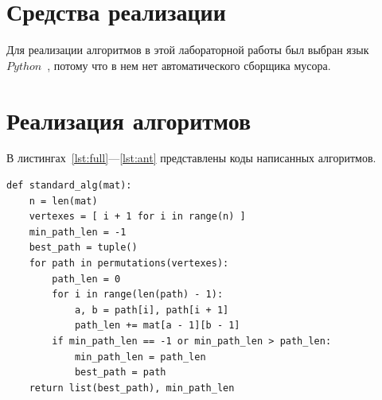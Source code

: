 \documentclass[a4paper, 12pt]{extreport}
\begin{document}
\section{Средства реализации}

Для реализации алгоритмов в этой лабораторной работы был выбран язык $Python$~\cite{python3}, потому что в нем нет 
автоматического сборщика мусора.

\section{Реализация алгоритмов}

В листингах~\ref{lst:full}---\ref{lst:ant} представлены коды написанных алгоритмов.

\begin{lstlisting}[style=python, label=lst:full,caption=Алгоритм полного перебора]
def standard_alg(mat):
    n = len(mat)
    vertexes = [ i + 1 for i in range(n) ]
    min_path_len = -1
    best_path = tuple()
    for path in permutations(vertexes):
        path_len = 0
        for i in range(len(path) - 1):
            a, b = path[i], path[i + 1]
            path_len += mat[a - 1][b - 1]
        if min_path_len == -1 or min_path_len > path_len:
            min_path_len = path_len
            best_path = path
    return list(best_path), min_path_len
\end{lstlisting}
\end{document}
